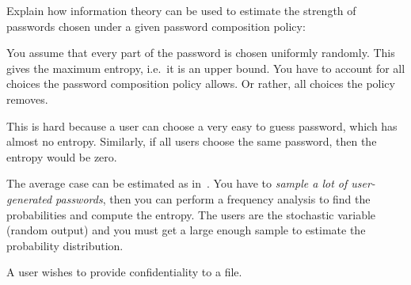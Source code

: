 \documentclass[svv,addpoints]{miunexam}
\begin{document}
\begin{questions}
\question\label{q:infotheory:passwd:E:C}
  Explain how information theory can be used to estimate the strength of 
  passwords chosen under a given password composition policy:

  \begin{solution}
    You assume that every part of the password is chosen uniformly randomly.
    This gives the maximum entropy, i.e.~it is an upper bound.
    You have to account for all choices the password composition policy allows.
    Or rather, all choices the policy removes.

    This is hard because a user can choose a very easy to guess password, which 
    has almost no entropy.
    Similarly, if all users choose the same password, then the entropy would be 
    zero.

    The average case can be estimated as in~\cite{Komanduri2011opa}.
    You have to \emph{sample a lot of user-generated passwords}, then you can 
    perform a frequency analysis to find the probabilities and compute the 
    entropy.
    The users are the stochastic variable (random output) and you must get 
    a large enough sample to estimate the probability distribution.
  \end{solution}


  
\question\label{q:crypto:accessctrl:E:C}
  A user wishes to provide confidentiality to a file.
\end{questions}
\end{document}
